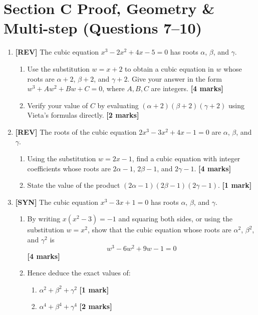 \documentclass[11pt,a4paper]{article}
\begin{document}
\section*{Section C \quad Proof, Geometry \& Multi-step \hfill{\normalfont\footnotesize(Questions 7--10)}}
\begin{enumerate}[resume]

\item \textbf{[REV]} The cubic equation $x^3 - 2x^2 + 4x - 5 = 0$ has roots $\alpha$, $\beta$, and $\gamma$.
\begin{enumerate}[label=(\alph*)]
  \item Use the substitution $w = x + 2$ to obtain a cubic equation in $w$ whose roots are $\alpha + 2$, $\beta + 2$, and $\gamma + 2$. Give your answer in the form $w^3 + Aw^2 + Bw + C = 0$, where $A, B, C$ are integers. \hfill{\textbf{[4 marks]}}
  \item Verify your value of $C$ by evaluating $(\alpha + 2)(\beta + 2)(\gamma + 2)$ using Vieta's formulas directly. \hfill{\textbf{[2 marks]}}
\end{enumerate}

\item \textbf{[REV]} The roots of the cubic equation $2x^3 - 3x^2 + 4x - 1 = 0$ are $\alpha$, $\beta$, and $\gamma$.
\begin{enumerate}[label=(\alph*)]
  \item Using the substitution $w = 2x - 1$, find a cubic equation with integer coefficients whose roots are $2\alpha - 1$, $2\beta - 1$, and $2\gamma - 1$. \hfill{\textbf{[4 marks]}}
  \item State the value of the product $(2\alpha - 1)(2\beta - 1)(2\gamma - 1)$. \hfill{\textbf{[1 mark]}}
\end{enumerate}

\item \textbf{[SYN]} The cubic equation $x^3 - 3x + 1 = 0$ has roots $\alpha$, $\beta$, and $\gamma$.
\begin{enumerate}[label=(\alph*)]
  \item By writing $x(x^2 - 3) = -1$ and squaring both sides, or using the substitution $w = x^2$, show that the cubic equation whose roots are $\alpha^2$, $\beta^2$, and $\gamma^2$ is
  \[
  w^3 - 6w^2 + 9w - 1 = 0
  \]
  \hfill{\textbf{[4 marks]}}
  \item Hence deduce the exact values of:
  \begin{enumerate}[label=(\roman*)]
    \item $\alpha^2 + \beta^2 + \gamma^2$ \hfill{\textbf{[1 mark]}}
    \item $\alpha^4 + \beta^4 + \gamma^4$ \hfill{\textbf{[2 marks]}}
  \end{enumerate}
\end{enumerate}


\end{enumerate}
\end{document}
